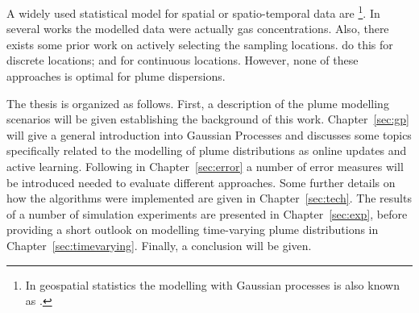 A widely used statistical model for spatial or spatio-temporal data are 
\footnote{In geospatial statistics the modelling 
    with Gaussian processes is also known as .}. In several 
works \parencite[e.\,g.][]{Stachniss:2008vz, Marchant:2012wb} the modelled data 
were actually gas concentrations. Also, there exists some prior work on actively 
selecting the sampling locations. \Textcite{Stranders:2008wl} do this for 
discrete locations; \textcite{Singh:2010wt} and \textcite{Marchant:2012wb} for 
continuous locations. However, none of these approaches is optimal for plume 
dispersions.

The thesis is organized as follows. First, a description of the plume modelling 
scenarios will be given establishing the background of this work.  
Chapter~\ref{sec:gp} will give a general introduction into Gaussian Processes 
and discusses some topics specifically related to the modelling of plume 
distributions as online updates and active learning. Following in 
Chapter~\ref{sec:error} a number of error measures will be introduced needed to 
evaluate different approaches. Some further details on how the algorithms were 
implemented are given in Chapter~\ref{sec:tech}. The results of a number of 
simulation experiments are presented in Chapter~\ref{sec:exp}, before providing 
a short outlook on modelling time-varying plume distributions in 
Chapter~\ref{sec:timevarying}. Finally, a conclusion will be given.
